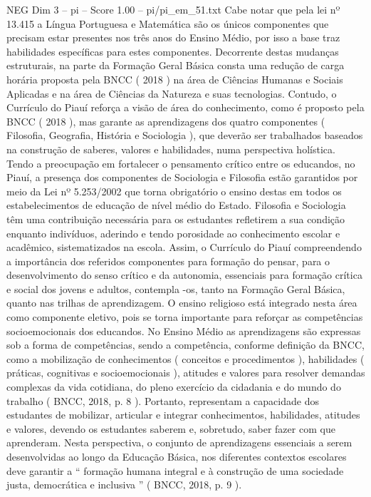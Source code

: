 \begin{textsample}{NEG Dim 3 – pi – Score 1.00 – pi/pi\_em\_51.txt}
Cabe notar que pela lei nº 13.415 a Língua Portuguesa e Matemática são os únicos componentes que precisam estar presentes nos três anos do Ensino Médio, por isso a base traz habilidades específicas para estes componentes.
Decorrente destas mudanças estruturais, na parte da Formação Geral Básica consta uma redução de carga horária proposta pela BNCC ( 2018 ) na área de Ciências Humanas e Sociais Aplicadas e na área de Ciências da Natureza e suas tecnologias.
Contudo, o Currículo do Piauí reforça a visão de área do conhecimento, como é proposto pela BNCC ( 2018 ), mas garante as aprendizagens dos quatro componentes ( Filosofia, Geografia, História e Sociologia ), que deverão ser trabalhados baseados na construção de saberes, valores e habilidades, numa perspectiva holística.
Tendo a preocupação em fortalecer o pensamento crítico entre os educandos, no Piauí, a presença dos componentes de Sociologia e Filosofia estão garantidos por meio da Lei nº 5.253/2002 que torna obrigatório o ensino destas em todos os estabelecimentos de educação de nível médio do Estado.
Filosofia e Sociologia têm uma contribuição necessária para os estudantes refletirem a sua condição enquanto indivíduos, aderindo e tendo porosidade ao conhecimento escolar e acadêmico, sistematizados na escola.
Assim, o Currículo do Piauí compreendendo a importância dos referidos componentes para formação do pensar, para o desenvolvimento do senso crítico e da autonomia, essenciais para formação crítica e social dos jovens e adultos, contempla -os, tanto na Formação Geral Básica, quanto nas trilhas de aprendizagem.
O ensino religioso está integrado nesta área como componente eletivo, pois se torna importante para reforçar as competências socioemocionais dos educandos.
No Ensino Médio as aprendizagens são expressas sob a forma de competências, sendo a competência, conforme definição da BNCC, como a mobilização de conhecimentos ( conceitos e procedimentos ), habilidades ( práticas, cognitivas e socioemocionais ), atitudes e valores para resolver demandas complexas da vida cotidiana, do pleno exercício da cidadania e do mundo do trabalho ( BNCC, 2018, p. 8 ).
Portanto, representam a capacidade dos estudantes de mobilizar, articular e integrar conhecimentos, habilidades, atitudes e valores, devendo os estudantes saberem e, sobretudo, saber fazer com que aprenderam.
Nesta perspectiva, o conjunto de aprendizagens essenciais a serem desenvolvidas ao longo da Educação Básica, nos diferentes contextos escolares deve garantir a “ formação humana integral e à construção de uma sociedade justa, democrática e inclusiva ” ( BNCC, 2018, p. 9 ).

\end{textsample}
